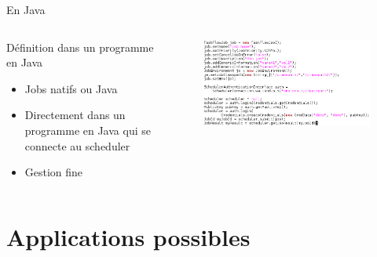 \documentclass{beamer}
\begin{document}
\begin{frame}{En Java}
	\begin{columns}
	\begin{column}[l]{0.4\linewidth}
        \begin{block}{Définition dans un programme en Java}
            \begin{itemize}
                \item Jobs natifs ou Java
                \item Directement dans un programme en Java qui se connecte au scheduler
                \item Gestion fine
            \end{itemize}
        \end{block}
	\end{column}
	\begin{column}[r]{0.6\linewidth}
        \vspace{-1cm}
        \begin{figure}
            \centering
            \includegraphics[scale=0.32]{jobjava.png}
        \end{figure}
	\end{column}
	\end{columns}
    
\end{frame}


\section[Applications]{Applications possibles}
\begin{frame}
	\tableofcontents[currentsection]
\end{frame}
\end{document}
